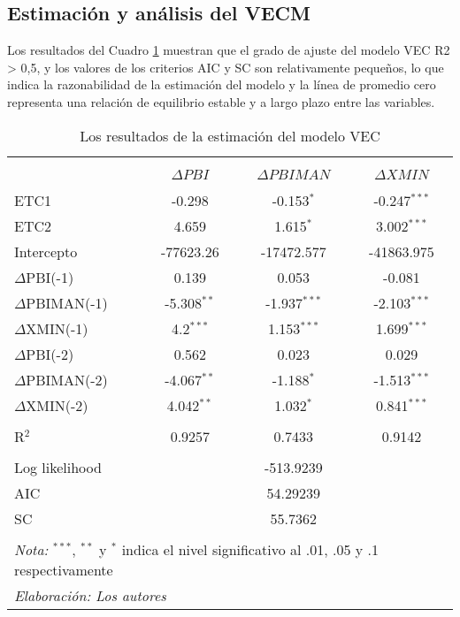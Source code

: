 \documentclass[11pt,]{article}
\begin{document}
\hypertarget{estimacion-y-analisis-del-vecm}{%
\subsection{Estimación y análisis del
VECM}\label{estimacion-y-analisis-del-vecm}}

Los resultados del Cuadro \ref{tab:tb6} muestran que el grado de ajuste
del modelo VEC R2 \textgreater{} 0,5, y los valores de los criterios AIC
y SC son relativamente pequeños, lo que indica la razonabilidad de la
estimación del modelo y la línea de promedio cero representa una
relación de equilibrio estable y a largo plazo entre las variables.

\begin{table}[!htbp] \centering 
  \caption{Los resultados de la estimación del modelo VEC} 
  \label{tab:tb6} 
\small 
\begin{tabular}{@{\extracolsep{5pt}} lccc} 
\\[-1.8ex]\hline 
\hline \\[-1.8ex] 
\\[-1.8ex] & $\Delta PBI$  &  $\Delta PBIMAN$ & $\Delta XMIN$\\
\hline \\[-1.8ex] 
ETC1 & -0.298 & -0.153$^{*}$ & -0.247$^{***}$ \\ 
ETC2 & 4.659 & 1.615$^{*}$ & 3.002$^{***}$ \\ 
Intercepto & -77623.26 & -17472.577 & -41863.975 \\ 
 $\Delta$PBI(-1) & 0.139 & 0.053 & -0.081 \\ 
$\Delta$PBIMAN(-1) & -5.308$^{**}$ & -1.937$^{***}$ & -2.103$^{***}$ \\ 
$\Delta$XMIN(-1) & 4.2$^{***}$ & 1.153$^{***}$ & 1.699$^{***}$ \\ 
$\Delta$PBI(-2) & 0.562 & 0.023 & 0.029 \\ 
$\Delta$PBIMAN(-2) & -4.067$^{**}$ & -1.188$^{*}$ & -1.513$^{***}$ \\ 
$\Delta$XMIN(-2) & 4.042$^{**}$ & 1.032$^{*}$ & 0.841$^{***}$ \\ 
\hline \\[-1.8ex] 
R$^{2}$ & 0.9257 & 0.7433 & 0.9142 \\ 
\hline \\[-1.8ex] 
Log likelihood &  & -513.9239 &  \\ 
AIC &  & 54.29239 &  \\ 
SC &  & 55.7362 &  \\ 
\hline \\[-1.8ex] 
\multicolumn{4}{l}{\footnotesize{\textit{Nota:} $^{***}$, $^{**}$ y $^{*}$ indica el nivel significativo al .01, .05 y .1 respectivamente}} \\ 
\multicolumn{4}{l}{\footnotesize{\textit{Elaboración: Los autores}}} \\ 
\end{tabular} 
\end{table}
\end{document}

